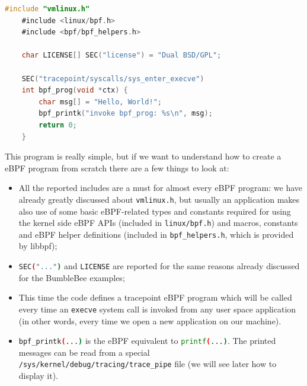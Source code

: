 \begin{lstlisting}[style=cstyle, language=C, caption={Code of the ``Hello world!''-like kernel side program in libbpf-bootstrap.}, title=example\_helloworld.bpf.c]
	#include "vmlinux.h"
	#include <linux/bpf.h>
	#include <bpf/bpf_helpers.h>
	
	char LICENSE[] SEC("license") = "Dual BSD/GPL";
	
	SEC("tracepoint/syscalls/sys_enter_execve")
	int bpf_prog(void *ctx) {
		char msg[] = "Hello, World!";
		bpf_printk("invoke bpf_prog: %s\n", msg);
		return 0;
	}
\end{lstlisting}

This program is really simple, but if we want to understand how to create a eBPF program from scratch there are a few things to look at:

\begin{itemize}
	\item 
		All the reported includes are a must for almost every eBPF program: we have already	greatly discussed about \colorbox{backcolour}{\lstinline[style=commandline, language=bash, breaklines=true]|vmlinux.h|}, but usually an application makes also use of some basic eBPF-related types and constants required for using the kernel side eBPF APIs (included in \colorbox{backcolour}{\lstinline[style=commandline, language=bash, breaklines=true]|linux/bpf.h|}) and macros, constants and eBPF helper definitions (included in \colorbox{backcolour}{\lstinline[style=commandline, language=bash, breaklines=true]|bpf_helpers.h|}, which is provided by libbpf);
	\item 
		\colorbox{backcolour}{\lstinline[style=commandline, language=bash, breaklines=true]|SEC("...")|} and \colorbox{backcolour}{\lstinline[style=commandline, language=bash, breaklines=true]|LICENSE|} are reported for the same reasons already discussed for the BumbleBee examples;
	\item 
		This time the code defines a tracepoint eBPF program which will be called every time an \colorbox{backcolour}{\lstinline[style=commandline, language=bash, breaklines=true]|execve|} system call is invoked from any user space application (in other words, every time we open a new application on our machine).
	\item 
		\colorbox{backcolour}{\lstinline[style=commandline, language=bash, breaklines=true]|bpf_printk(...)|} is the eBPF equivalent to \colorbox{backcolour}{\lstinline[style=commandline, language=bash, breaklines=true]|printf(...)|}. 
		The printed messages can be read from a special \colorbox{backcolour}{\lstinline[style=commandline, language=bash, breaklines=true]|/sys/kernel/debug/tracing/trace_pipe|} file (we will see later how to display it).
\end{itemize}

